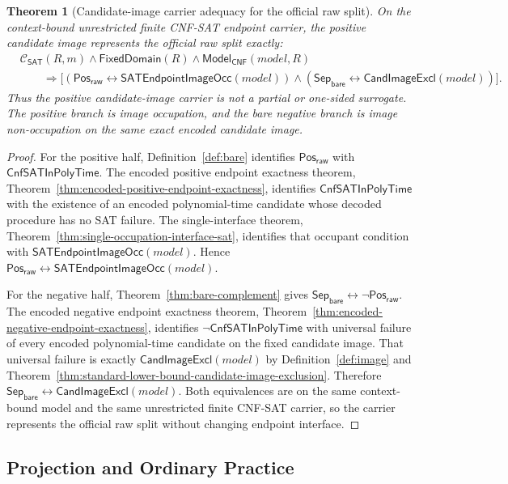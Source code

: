 \documentclass[11pt]{article}
\newtheorem{theorem}{Theorem}[section]
\theoremstyle{definition}
\theoremstyle{remark}
\newcommand{\PosRaw}{\mathsf{Pos}_{\mathsf{raw}}}
\newcommand{\SepBare}{\mathsf{Sep}_{\mathsf{bare}}}
\newcommand{\CnfSATP}{\mathsf{CnfSATInPolyTime}}
\newcommand{\ClayCtx}{\mathcal{C}_{\mathsf{SAT}}(R,m)}
\newcommand{\FixedDom}{\mathsf{FixedDomain}}
\newcommand{\ModelOfCnf}{\mathsf{Model}_{\mathsf{CNF}}}
\newcommand{\CandImageExcl}{\mathsf{CandImageExcl}}
\newcommand{\SATEndpointImageOcc}{\mathsf{SATEndpointImageOcc}}
\begin{document}
\begin{theorem}[Candidate-image carrier adequacy for the official raw split]\label{thm:candidate-image-carrier-adequacy-raw-split}
On the context-bound unrestricted finite CNF-SAT endpoint carrier, the positive candidate image represents the official raw split exactly:
\[
\begin{aligned}
  &\ClayCtx\wedge\FixedDom(R)\wedge\ModelOfCnf(model,R)\\
  &\qquad\Rightarrow
  \bigl[(\PosRaw\leftrightarrow\SATEndpointImageOcc(model))
  \wedge(\SepBare\leftrightarrow\CandImageExcl(model))\bigr].
\end{aligned}
\]
Thus the positive candidate-image carrier is not a partial or one-sided surrogate. The positive branch is image occupation, and the bare negative branch is image non-occupation on the same exact encoded candidate image.
\end{theorem}

\begin{proof}
For the positive half, Definition~\ref{def:bare} identifies \(\PosRaw\) with \(\CnfSATP\). The encoded positive endpoint exactness theorem, Theorem~\ref{thm:encoded-positive-endpoint-exactness}, identifies \(\CnfSATP\) with the existence of an encoded polynomial-time candidate whose decoded procedure has no SAT failure. The single-interface theorem, Theorem~\ref{thm:single-occupation-interface-sat}, identifies that occupant condition with \(\SATEndpointImageOcc(model)\). Hence \(\PosRaw\leftrightarrow\SATEndpointImageOcc(model)\).

For the negative half, Theorem~\ref{thm:bare-complement} gives \(\SepBare\leftrightarrow\neg\PosRaw\). The encoded negative endpoint exactness theorem, Theorem~\ref{thm:encoded-negative-endpoint-exactness}, identifies \(\neg\CnfSATP\) with universal failure of every encoded polynomial-time candidate on the fixed candidate image. That universal failure is exactly \(\CandImageExcl(model)\) by Definition~\ref{def:image} and Theorem~\ref{thm:standard-lower-bound-candidate-image-exclusion}. Therefore \(\SepBare\leftrightarrow\CandImageExcl(model)\). Both equivalences are on the same context-bound model and the same unrestricted finite CNF-SAT carrier, so the carrier represents the official raw split without changing endpoint interface.
\end{proof}



\subsection{Projection and Ordinary Practice}\label{subsec:projection-ordinary-practice}
\end{document}
